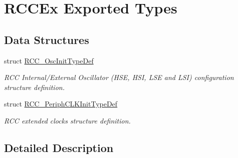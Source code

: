 \hypertarget{group___r_c_c_ex___exported___types}{}\section{R\+C\+C\+Ex Exported Types}
\label{group___r_c_c_ex___exported___types}
\subsection*{Data Structures}
\begin{DoxyCompactItemize}
\item 
struct \hyperlink{struct_r_c_c___osc_init_type_def}{R\+C\+C\+\_\+\+Osc\+Init\+Type\+Def}
\begin{DoxyCompactList}\small\item\em R\+CC Internal/\+External Oscillator (H\+SE, H\+SI, L\+SE and L\+SI) configuration structure definition. \end{DoxyCompactList}\item 
struct \hyperlink{struct_r_c_c___periph_c_l_k_init_type_def}{R\+C\+C\+\_\+\+Periph\+C\+L\+K\+Init\+Type\+Def}
\begin{DoxyCompactList}\small\item\em R\+CC extended clocks structure definition. \end{DoxyCompactList}\end{DoxyCompactItemize}


\subsection{Detailed Description}
